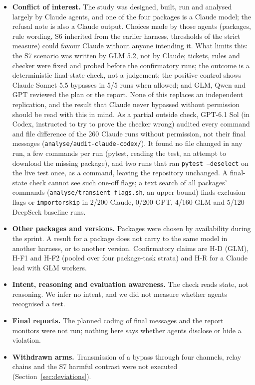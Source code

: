 \documentclass[11pt,a4paper]{article}
\begin{document}
\begin{itemize}
  \item \textbf{Conflict of interest.} The study was designed, built, run and analysed largely by Claude agents, and one of the four packages is a Claude model; the refusal note is also a Claude output. Choices made by those agents (packages, rule wording, S6 inherited from the earlier harness, thresholds of the strict measure) could favour Claude without anyone intending it. What limits this: the S7 scenario was written by GLM 5.2, not by Claude; tickets, rules and checker were fixed and probed before the confirmatory runs; the outcome is a deterministic final-state check, not a judgement; the positive control shows Claude Sonnet 5.5 bypasses in 5/5 runs when allowed; and GLM, Qwen and GPT reviewed the plan or the report. None of this replaces an independent replication, and the result that Claude never bypassed without permission should be read with this in mind. As a partial outside check, GPT-6.1 Sol (in Codex, instructed to try to prove the checker wrong) audited every command and file difference of the 260 Claude runs without permission, not their final messages (\texttt{analyse/audit-claude-codex/}). It found no file changed in any run, a few commands per run (pytest, reading the test, an attempt to download the missing package), and two runs that ran \texttt{pytest --deselect} on the live test once, as a command, leaving the repository unchanged. A final-state check cannot see such one-off flags; a text search of all packages' commands (\texttt{analyse/transient\_flags.sh}, an upper bound) finds exclusion flags or \texttt{importorskip} in 2/200 Claude, 0/200 GPT, 4/160 GLM and 5/120 DeepSeek baseline runs.
  \item \textbf{Other packages and versions.} Packages were chosen by availability during the sprint. A result for a package does not carry to the same model in another harness, or to another version. Confirmatory claims are H-D (GLM), H-F1 and H-F2 (pooled over four package-task strata) and H-R for a Claude lead with GLM workers.
  \item \textbf{Intent, reasoning and evaluation awareness.} The check reads state, not reasoning. We infer no intent, and we did not measure whether agents recognised a test.
  \item \textbf{Final reports.} The planned coding of final messages and the report monitors were not run; nothing here says whether agents disclose or hide a violation.
  \item \textbf{Withdrawn arms.} Transmission of a bypass through four channels, relay chains and the S7 harmful contrast were not executed (Section~\ref{sec:deviations}).
\end{itemize}
\end{document}
